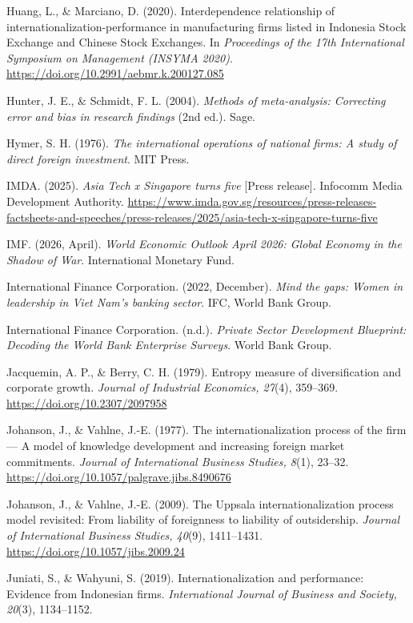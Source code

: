 \documentclass[
  a4paper,
  13pt]{extreport}
\begin{document}
Huang, L., \& Marciano, D. (2020). Interdependence relationship of
internationalization-performance in manufacturing firms listed in
Indonesia Stock Exchange and Chinese Stock Exchanges. In
\emph{Proceedings of the 17th International Symposium on Management
(INSYMA 2020)}. \url{https://doi.org/10.2991/aebmr.k.200127.085}

Hunter, J. E., \& Schmidt, F. L. (2004). \emph{Methods of meta-analysis:
Correcting error and bias in research findings} (2nd ed.). Sage.

Hymer, S. H. (1976). \emph{The international operations of national
firms: A study of direct foreign investment}. MIT Press.

IMDA. (2025). \emph{Asia Tech x Singapore turns five} {[}Press
release{]}. Infocomm Media Development Authority.
\url{https://www.imda.gov.sg/resources/press-releases-factsheets-and-speeches/press-releases/2025/asia-tech-x-singapore-turns-five}

IMF. (2026, April). \emph{World Economic Outlook April 2026: Global
Economy in the Shadow of War}. International Monetary Fund.

International Finance Corporation. (2022, December). \emph{Mind the
gaps: Women in leadership in Viet Nam's banking sector}. IFC, World Bank
Group.

International Finance Corporation. (n.d.). \emph{Private Sector
Development Blueprint: Decoding the World Bank Enterprise Surveys}.
World Bank Group.

Jacquemin, A. P., \& Berry, C. H. (1979). Entropy measure of
diversification and corporate growth. \emph{Journal of Industrial
Economics, 27}(4), 359--369. \url{https://doi.org/10.2307/2097958}

Johanson, J., \& Vahlne, J.-E. (1977). The internationalization process
of the firm --- A model of knowledge development and increasing foreign
market commitments. \emph{Journal of International Business Studies,
8}(1), 23--32. \url{https://doi.org/10.1057/palgrave.jibs.8490676}

Johanson, J., \& Vahlne, J.-E. (2009). The Uppsala internationalization
process model revisited: From liability of foreignness to liability of
outsidership. \emph{Journal of International Business Studies, 40}(9),
1411--1431. \url{https://doi.org/10.1057/jibs.2009.24}

Juniati, S., \& Wahyuni, S. (2019). Internationalization and
performance: Evidence from Indonesian firms. \emph{International Journal
of Business and Society, 20}(3), 1134--1152.
\end{document}
